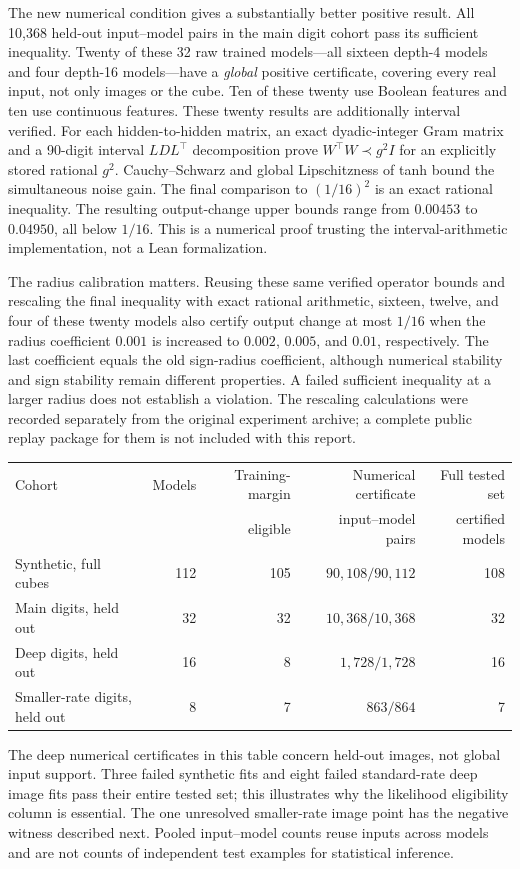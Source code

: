 The new numerical condition gives a substantially better positive result.
All 10,368 held-out input--model pairs in the main digit cohort pass its
sufficient inequality. Twenty of these 32 raw trained models---all sixteen
depth-4 models and four depth-16 models---have a \emph{global} positive
certificate, covering every real input, not only images or the cube.
Ten of these twenty use Boolean features and ten use continuous features.
These twenty results are additionally interval verified. For each
hidden-to-hidden matrix, an exact dyadic-integer Gram matrix and a
90-digit interval $LDL^\top$ decomposition prove
$W^\top W\prec g^2I$ for an explicitly stored rational $g^2$.
Cauchy--Schwarz and global Lipschitzness of tanh bound the simultaneous
noise gain. The final comparison to $(1/16)^2$ is an exact rational
inequality. The resulting output-change upper bounds range from
$0.00453$ to $0.04950$, all below $1/16$. This is a numerical proof
trusting the interval-arithmetic implementation, not a Lean formalization.

The radius calibration matters. Reusing these same verified operator bounds
and rescaling the final inequality with exact rational arithmetic, sixteen,
twelve, and four of these twenty models also certify output change at most
$1/16$ when the radius coefficient $0.001$ is increased to $0.002$, $0.005$,
and $0.01$, respectively. The last coefficient equals the old sign-radius
coefficient, although numerical stability and sign stability remain
different properties. A failed sufficient inequality at a larger radius
does not establish a violation. The rescaling calculations were recorded separately from the original
experiment archive; a complete public replay package for them is not
included with this report.

\begin{center}
\small\begin{tabular}{lrrrr}
\toprule
Cohort & Models & Training-margin & Numerical certificate & Full tested set\\
 & & eligible & input--model pairs & certified models\\
\midrule
Synthetic, full cubes & 112 & 105 & $90{,}108/90{,}112$ & 108\\
Main digits, held out & 32 & 32 & $10{,}368/10{,}368$ & 32\\
Deep digits, held out & 16 & 8 & $1{,}728/1{,}728$ & 16\\
Smaller-rate digits, held out & 8 & 7 & $863/864$ & 7\\
\bottomrule
\end{tabular}
\end{center}
The deep numerical certificates in this table concern held-out images,
not global input support. Three failed synthetic fits and eight failed
standard-rate deep image fits pass their entire tested set; this illustrates
why the likelihood eligibility column is essential. The one unresolved
smaller-rate image point has the negative witness described next.
Pooled input--model counts reuse inputs across models and are not counts
of independent test examples for statistical inference.

